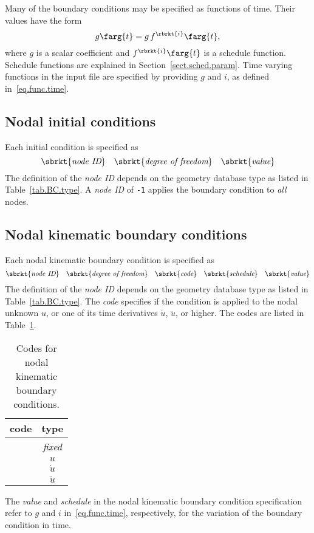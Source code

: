 Many of the boundary conditions may be specified as functions of 
time. Their values have the form
\begin{equation}
\label{eq.func.time}
    g\farg{t} = g\,f^{\rbrkt{i}}\farg{t},
\end{equation}
where $g$ is a scalar coefficient and $f^{\rbrkt{i}}\farg{t}$ is a
schedule function. Schedule functions are explained in 
Section~\ref{sect.sched.param}. Time varying functions in the input 
file are specified by providing $g$ and $i$, as defined 
in~\eqref{eq.func.time}.

\subsection{Nodal initial conditions}
\label{set.ICandBC.IC}
Each initial condition is specified as
\[
\sbrkt{\textit{node ID}} \quad 
\sbrkt{\textit{degree of freedom}} \quad
\sbrkt{\textit{value}}
\]
The definition of the \textit{node ID} depends on the geometry 
database type as listed in Table~\ref{tab.BC.type}. A \textit{node ID} 
of \texttt{-1} applies the boundary condition to \textit{all} nodes.

\subsection{Nodal kinematic boundary conditions}
\label{set.ICandBC.KBC}
Each nodal kinematic boundary condition is specified as
\[
\sbrkt{\textit{node ID}} \quad 
\sbrkt{\textit{degree of freedom}} \quad
\sbrkt{\textit{code}} \quad
\sbrkt{\textit{schedule}} \quad
\sbrkt{\textit{value}} 
\]
The definition of the \textit{node ID} depends on the geometry 
database type as listed in Table~\ref{tab.BC.type}. The \textit{code} 
specifies if the condition is applied to the nodal unknown $u$, or one 
of its time derivatives $\dot{u}$, $\ddot{u}$, or higher. The codes 
are listed in Table~\ref{tab.KBC.code}.
\begin{table}[h]
\begin{center}
\caption{\label{tab.KBC.code} Codes for nodal kinematic boundary 
conditions.}
\begin{tabular}[c]{|c|c|}
\hline
 \parbox[b]{0.75in}{\centering \textbf{code}}
&\parbox[b]{0.75in}{\centering \textbf{type}}\\
\hline
 \parbox[b]{0.75in}{}
&\parbox[b]{0.75in}{\centering \textit{fixed}}\\
\hline
 \parbox[b]{0.75in}{}
&\parbox[b]{0.75in}{\centering $u$}\\
\hline
 \parbox[b]{0.75in}{}
&\parbox[b]{0.75in}{\centering $\dot{u}$}\\
\hline
 \parbox[b]{0.75in}{}
&\parbox[b]{0.75in}{\centering $\ddot{u}$}\\
\hline
\end{tabular}
\end{center}
\end{table}
The \textit{value} and \textit{schedule} in the nodal kinematic 
boundary condition specification refer to 
$g$ and $i$ in~\eqref{eq.func.time}, respectively, for the variation 
of the boundary condition in time.

